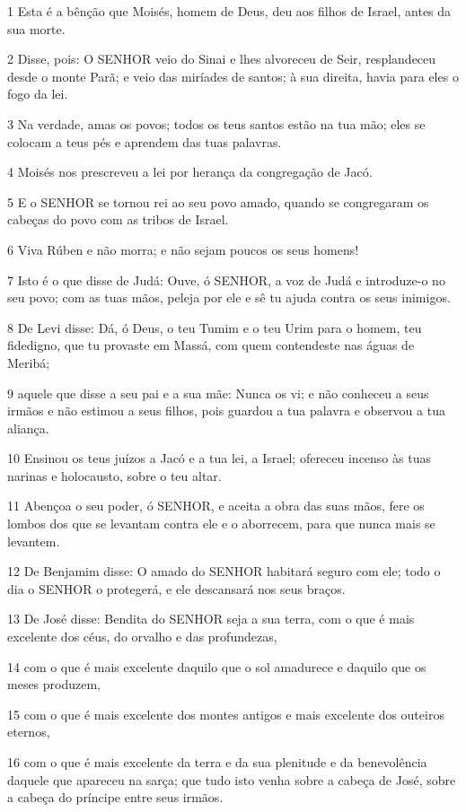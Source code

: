 \par 1 Esta é a bênção que Moisés, homem de Deus, deu aos filhos de Israel, antes da sua morte.
\par 2 Disse, pois: O SENHOR veio do Sinai e lhes alvoreceu de Seir, resplandeceu desde o monte Parã; e veio das miríades de santos; à sua direita, havia para eles o fogo da lei.
\par 3 Na verdade, amas os povos; todos os teus santos estão na tua mão; eles se colocam a teus pés e aprendem das tuas palavras.
\par 4 Moisés nos prescreveu a lei por herança da congregação de Jacó.
\par 5 E o SENHOR se tornou rei ao seu povo amado, quando se congregaram os cabeças do povo com as tribos de Israel.
\par 6 Viva Rúben e não morra; e não sejam poucos os seus homens!
\par 7 Isto é o que disse de Judá: Ouve, ó SENHOR, a voz de Judá e introduze-o no seu povo; com as tuas mãos, peleja por ele e sê tu ajuda contra os seus inimigos.
\par 8 De Levi disse: Dá, ó Deus, o teu Tumim e o teu Urim para o homem, teu fidedigno, que tu provaste em Massá, com quem contendeste nas águas de Meribá;
\par 9 aquele que disse a seu pai e a sua mãe: Nunca os vi; e não conheceu a seus irmãos e não estimou a seus filhos, pois guardou a tua palavra e observou a tua aliança.
\par 10 Ensinou os teus juízos a Jacó e a tua lei, a Israel; ofereceu incenso às tuas narinas e holocausto, sobre o teu altar.
\par 11 Abençoa o seu poder, ó SENHOR, e aceita a obra das suas mãos, fere os lombos dos que se levantam contra ele e o aborrecem, para que nunca mais se levantem.
\par 12 De Benjamim disse: O amado do SENHOR habitará seguro com ele; todo o dia o SENHOR o protegerá, e ele descansará nos seus braços.
\par 13 De José disse: Bendita do SENHOR seja a sua terra, com o que é mais excelente dos céus, do orvalho e das profundezas,
\par 14 com o que é mais excelente daquilo que o sol amadurece e daquilo que os meses produzem,
\par 15 com o que é mais excelente dos montes antigos e mais excelente dos outeiros eternos,
\par 16 com o que é mais excelente da terra e da sua plenitude e da benevolência daquele que apareceu na sarça; que tudo isto venha sobre a cabeça de José, sobre a cabeça do príncipe entre seus irmãos.
